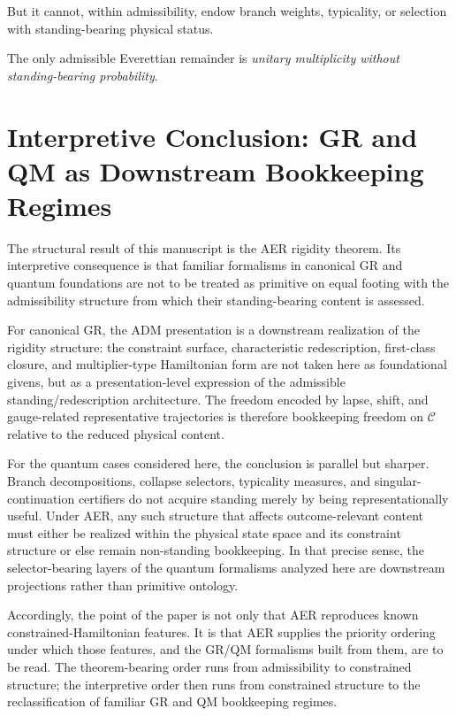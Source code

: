 \documentclass[11pt]{article}
\theoremstyle{remark}
\theoremstyle{plain}
\begin{document}
But it cannot, within admissibility, endow branch weights,
typicality, or selection with standing-bearing physical status.

The only admissible Everettian remainder is
\emph{unitary multiplicity without standing-bearing probability}.




\section*{Interpretive Conclusion: GR and QM as Downstream Bookkeeping Regimes}

The structural result of this manuscript is the AER rigidity theorem.
Its interpretive consequence is that familiar formalisms in canonical GR and quantum foundations are not to be treated as primitive on equal footing with the admissibility structure from which their standing-bearing content is assessed.

For canonical GR, the ADM presentation is a downstream realization of the rigidity structure:
the constraint surface, characteristic redescription, first-class closure, and multiplier-type Hamiltonian form are not taken here as foundational givens, but as a presentation-level expression of the admissible standing/redescription architecture. The freedom encoded by lapse, shift, and gauge-related representative trajectories is therefore bookkeeping freedom on $\mathcal{C}$ relative to the reduced physical content.

For the quantum cases considered here, the conclusion is parallel but sharper.
Branch decompositions, collapse selectors, typicality measures, and singular-continuation certifiers do not acquire standing merely by being representationally useful. Under AER, any such structure that affects outcome-relevant content must either be realized within the physical state space and its constraint structure or else remain non-standing bookkeeping. In that precise sense, the selector-bearing layers of the quantum formalisms analyzed here are downstream projections rather than primitive ontology.

Accordingly, the point of the paper is not only that AER reproduces known constrained-Hamiltonian features. It is that AER supplies the priority ordering under which those features, and the GR/QM formalisms built from them, are to be read. The theorem-bearing order runs from admissibility to constrained structure; the interpretive order then runs from constrained structure to the reclassification of familiar GR and QM bookkeeping regimes.
\end{document}
